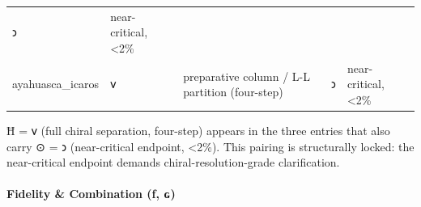 \documentclass[12pt,a4paper]{article}
\begin{document}
\begin{longtable}[]{@{}lllll@{}}
\begin{minipage}[t]{0.17\columnwidth}
𐑮\strut
\end{minipage} & \begin{minipage}[t]{0.17\columnwidth}\raggedright
near-critical, \textless2\%\strut
\end{minipage}\tabularnewline
\begin{minipage}[t]{0.17\columnwidth}\raggedright
ayahuasca\_icaros\strut
\end{minipage} & \begin{minipage}[t]{0.17\columnwidth}\raggedright
𐑫\strut
\end{minipage} & \begin{minipage}[t]{0.17\columnwidth}\raggedright
preparative column / L-L partition (four-step)\strut
\end{minipage} & \begin{minipage}[t]{0.17\columnwidth}\raggedright
𐑮\strut
\end{minipage} & \begin{minipage}[t]{0.17\columnwidth}\raggedright
near-critical, \textless2\%\strut
\end{minipage}\tabularnewline
\bottomrule
\end{longtable}

Ħ = 𐑫 (full chiral separation, four-step) appears in the three entries
that also carry ⊙ = 𐑮 (near-critical endpoint, \textless2\%). This
pairing is structurally locked: the near-critical endpoint demands
chiral-resolution-grade clarification.

\hypertarget{fidelity-combination-ux192-ux262}{%
\paragraph{Fidelity \& Combination (ƒ,
ɢ)}\label{fidelity-combination-ux192-ux262}}
\end{document}
